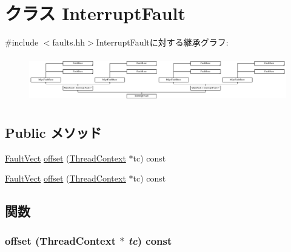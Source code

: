 \hypertarget{classMipsISA_1_1InterruptFault}{
\section{クラス InterruptFault}
\label{classMipsISA_1_1InterruptFault}
}


{\ttfamily \#include $<$faults.hh$>$}InterruptFaultに対する継承グラフ:\begin{figure}[H]
\begin{center}
\leavevmode
\includegraphics[height=2.01149cm]{classMipsISA_1_1InterruptFault}
\end{center}
\end{figure}
\subsection*{Public メソッド}
\begin{DoxyCompactItemize}
\item 
\hyperlink{classm5_1_1params_1_1Addr}{FaultVect} \hyperlink{classMipsISA_1_1InterruptFault_a9c059b781f653170e9da1d520c6d96b1}{offset} (\hyperlink{classThreadContext}{ThreadContext} $\ast$tc) const 
\item 
\hyperlink{classm5_1_1params_1_1Addr}{FaultVect} \hyperlink{classMipsISA_1_1InterruptFault_a9c059b781f653170e9da1d520c6d96b1}{offset} (\hyperlink{classThreadContext}{ThreadContext} $\ast$tc) const 
\end{DoxyCompactItemize}


\subsection{関数}
\hypertarget{classMipsISA_1_1InterruptFault_a9c059b781f653170e9da1d520c6d96b1}{
\subsubsection[{offset}]{ offset ({\bf ThreadContext} $\ast$ {\em tc}) const}}
\label{classMipsISA_1_1InterruptFault_a9c059b781f653170e9da1d520c6d96b1}


